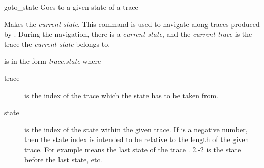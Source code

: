 \begin{nusmvCommand} {goto\_state} {Goes to a given state of a trace}


Makes  the \emph{current state}. This command is used to
navigate along traces produced by \nusmv. During the navigation, there
is a \emph{current state}, and the \emph{current trace} is the trace
the \emph{current state} belongs to.

 is in the form \emph{trace.state} where 
\begin{description}
  \item [trace] is the index of the trace which the state has to be taken from.

  \item [state] is the index of the state within the given
    trace. If  is a negative number, then the state
    index is intended to be relative to the length of the given
    trace. For example  means the last state of the
    trace . 2.-2 is the state before the last state, etc.
\end{description}

\end{nusmvCommand}
